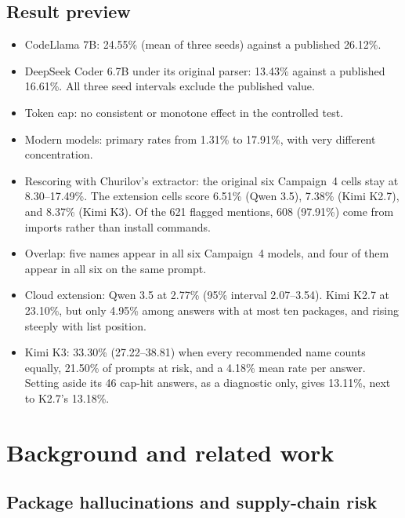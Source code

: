 \documentclass[10pt,twocolumn,letterpaper]{article}
\begin{document}
\subsection{Result preview}

\begin{itemize}
\item CodeLlama 7B: 24.55\% (mean of three seeds) against a published 26.12\%.
\item DeepSeek Coder 6.7B under its original parser: 13.43\% against a published 16.61\%. All three
  seed intervals exclude the published value.
\item Token cap: no consistent or monotone effect in the controlled test.
\item Modern models: primary rates from 1.31\% to 17.91\%, with very different concentration.
\item Rescoring with Churilov's extractor: the original six Campaign~4 cells stay at 8.30--17.49\%.
  The extension cells score 6.51\% (Qwen 3.5), 7.38\% (Kimi K2.7), and 8.37\% (Kimi K3). Of the 621
  flagged mentions, 608 (97.91\%) come from imports rather than install commands.
\item Overlap: five names appear in all six Campaign~4 models, and four of them appear in all six on
  the same prompt.
\item Cloud extension: Qwen 3.5 at 2.77\% (95\% interval 2.07--3.54). Kimi K2.7 at 23.10\%, but only
  4.95\% among answers with at most ten packages, and rising steeply with list position.
\item Kimi K3: 33.30\% (27.22--38.81) when every recommended name counts equally, 21.50\% of prompts
  at risk, and a 4.18\% mean rate per answer. Setting aside its 46 cap-hit answers, as a diagnostic
  only, gives 13.11\%, next to K2.7's 13.18\%.
\end{itemize}

\section{Background and related work}
\label{sec:background}

\subsection{Package hallucinations and supply-chain risk}
\end{document}
